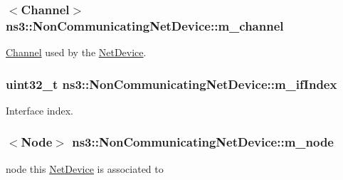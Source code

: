 \subsubsection[{\texorpdfstring{m\+\_\+channel}{m_channel}}]{$<${\bf Channel}$>$ ns3\+::\+Non\+Communicating\+Net\+Device\+::m\+\_\+channel\hspace{0.3cm}{\ttfamily [private]}}\hypertarget{classns3_1_1NonCommunicatingNetDevice_a55673c01c4e79cf417ca34e7d6b04737}{}\label{classns3_1_1NonCommunicatingNetDevice_a55673c01c4e79cf417ca34e7d6b04737}


\hyperlink{classns3_1_1Channel}{Channel} used by the \hyperlink{classns3_1_1NetDevice}{Net\+Device}. 

\subsubsection[{\texorpdfstring{m\+\_\+if\+Index}{m_ifIndex}}]{\setlength{\rightskip}{0pt plus 5cm}uint32\+\_\+t ns3\+::\+Non\+Communicating\+Net\+Device\+::m\+\_\+if\+Index\hspace{0.3cm}{\ttfamily [private]}}\hypertarget{classns3_1_1NonCommunicatingNetDevice_a9788909405c07a484167d4a4f7ea8a54}{}\label{classns3_1_1NonCommunicatingNetDevice_a9788909405c07a484167d4a4f7ea8a54}


Interface index. 

\subsubsection[{\texorpdfstring{m\+\_\+node}{m_node}}]{$<${\bf Node}$>$ ns3\+::\+Non\+Communicating\+Net\+Device\+::m\+\_\+node\hspace{0.3cm}{\ttfamily [private]}}\hypertarget{classns3_1_1NonCommunicatingNetDevice_a04d78a4d8ab99ee0b83976fa580d07db}{}\label{classns3_1_1NonCommunicatingNetDevice_a04d78a4d8ab99ee0b83976fa580d07db}


node this \hyperlink{classns3_1_1NetDevice}{Net\+Device} is associated to 


